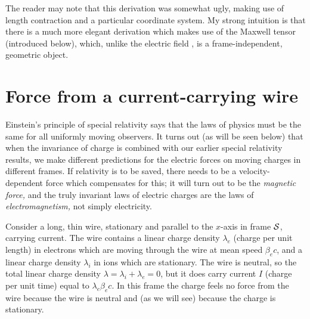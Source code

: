 The reader may note that this derivation was somewhat ugly, making use
of length contraction and a particular coordinate system.  My strong
intuition is that there is a much more elegant derivation which makes
use of the Maxwell tensor (introduced below), which, unlike the
electric field , is a frame-independent, geometric object.


\section{Force from a current-carrying wire}

Einstein's principle of special relativity says that the laws of
physics must be the same for all uniformly moving observers.  It turns
out (as will be seen below) that when the invariance of charge is
combined with our earlier special relativity results, we make
different predictions for the electric forces on moving charges in
different frames.  If relativity is to be saved, there needs to be a
velocity-dependent force which compensates for this; it will turn out
to be the {\em magnetic force,\/} and the truly invariant laws of
electric charges are the laws of {\em electromagnetism,\/} not simply
electricity.

Consider a long, thin wire, stationary and parallel to the $x$-axis in
frame $\cal{S}$, carrying current.  The wire contains a linear charge
density $\lambda_e$ (charge per unit length) in electrons which are
moving through the wire at mean speed $\beta_ec$, and a linear charge
density $\lambda_i$ in ions which are stationary.  The wire is
neutral, so the total linear charge density
$\lambda=\lambda_i+\lambda_e=0$, but it does carry current $I$ (charge
per unit time) equal to $\lambda_e\beta_ec$.  In this frame the charge
feels no force from the wire because the wire is neutral and (as we
will see) because the charge is stationary.

